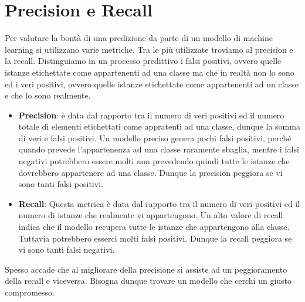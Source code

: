 \section{Precision e Recall}
\label{par:precisionRecall}
Per valutare la bontà di una predizione da parte di un modello di machine learning si utilizzano varie metriche. Tra le più utilizzate troviamo al precision e la recall. Distinguiamo in un processo predittivo i falsi positivi, ovvero quelle istanze etichettate come appartenenti ad una classe ma che in realtà non lo sono ed i veri positivi, ovvero quelle istanze etichettate come appartenenti ad un classe e che lo sono realmente.
\begin{itemize}
    \item \textbf{Precision}: è data dal rapporto tra il numero di veri positivi ed il numero totale di elementi etichettati come appratenti ad una classe, dunque la somma di veri e falsi positivi. Un modello preciso genera pochi falsi positivi, perché quando prevede l'appartenenza ad una classe raramente sbaglia, mentre i falsi negativi potrebbero essere molti non prevedendo quindi tutte le istanze che dovrebbero appartenere ad una classe. Dunque la precision peggiora se vi sono tanti falsi positivi. 
    \item \textbf{Recall}: Questa metrica è data dal rapporto tra il numero di veri positivi ed il numero di istanze che realmente vi appartengono. Un alto valore di recall indica che il modello recupera tutte le istanze che appartengono alla classe. Tuttavia potrebbero esserci molti falsi positivi. Dunque la recall peggiora se vi sono tanti falsi negativi. 
\end{itemize}
Spesso accade che al migliorare della precisione si assiste ad un peggioramento della recall e viceversa. Bisogna dunque trovare un modello che cerchi un giusto compromesso. 